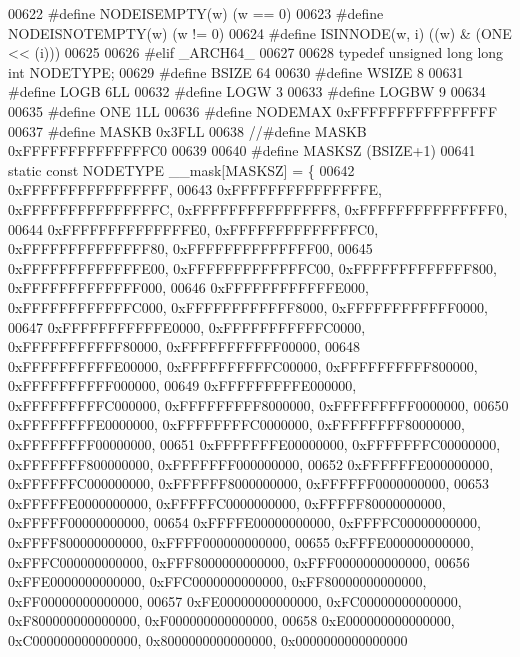 \begin{DoxyCode}
00622 \textcolor{preprocessor}{#define NODEISEMPTY(w) (w == 0)}
00623 \textcolor{preprocessor}{#define NODEISNOTEMPTY(w) (w != 0)}
00624 \textcolor{preprocessor}{#define ISINNODE(w, i) ((w) & (ONE << (i)))                                                     }
00625 \textcolor{preprocessor}{}
00626 \textcolor{preprocessor}{#elif \_ARCH64\_}
00627 
00628 \textcolor{keyword}{typedef} \textcolor{keywordtype}{unsigned} \textcolor{keywordtype}{long} \textcolor{keywordtype}{long} \textcolor{keywordtype}{int} NODETYPE; 
00629 \textcolor{preprocessor}{#define BSIZE 64}
00630 \textcolor{preprocessor}{#define WSIZE 8}
00631 \textcolor{preprocessor}{#define LOGB 6LL}
00632 \textcolor{preprocessor}{#define LOGW 3}
00633 \textcolor{preprocessor}{#define LOGBW 9}
00634 
00635 \textcolor{preprocessor}{#define ONE 1LL}
00636 \textcolor{preprocessor}{#define NODEMAX 0xFFFFFFFFFFFFFFFF}
00637 \textcolor{preprocessor}{#define MASKB 0x3FLL}
00638 \textcolor{comment}{//#define MASKB 0xFFFFFFFFFFFFFFC0}
00639 
00640 \textcolor{preprocessor}{#define MASKSZ (BSIZE+1)}
00641 \textcolor{keyword}{static} \textcolor{keyword}{const} NODETYPE \_\_mask[MASKSZ] = \{
00642         0xFFFFFFFFFFFFFFFF,
00643         0xFFFFFFFFFFFFFFFE, 0xFFFFFFFFFFFFFFFC, 0xFFFFFFFFFFFFFFF8, 0xFFFFFFFFFFFFFFF0,
00644         0xFFFFFFFFFFFFFFE0, 0xFFFFFFFFFFFFFFC0, 0xFFFFFFFFFFFFFF80, 0xFFFFFFFFFFFFFF00,
00645         0xFFFFFFFFFFFFFE00, 0xFFFFFFFFFFFFFC00, 0xFFFFFFFFFFFFF800, 0xFFFFFFFFFFFFF000,
00646         0xFFFFFFFFFFFFE000, 0xFFFFFFFFFFFFC000, 0xFFFFFFFFFFFF8000, 0xFFFFFFFFFFFF0000,
00647         0xFFFFFFFFFFFE0000, 0xFFFFFFFFFFFC0000, 0xFFFFFFFFFFF80000, 0xFFFFFFFFFFF00000,
00648         0xFFFFFFFFFFE00000, 0xFFFFFFFFFFC00000, 0xFFFFFFFFFF800000, 0xFFFFFFFFFF000000,
00649         0xFFFFFFFFFE000000, 0xFFFFFFFFFC000000, 0xFFFFFFFFF8000000, 0xFFFFFFFFF0000000,
00650         0xFFFFFFFFE0000000, 0xFFFFFFFFC0000000, 0xFFFFFFFF80000000, 0xFFFFFFFF00000000,
00651         0xFFFFFFFE00000000, 0xFFFFFFFC00000000, 0xFFFFFFF800000000, 0xFFFFFFF000000000,
00652         0xFFFFFFE000000000, 0xFFFFFFC000000000, 0xFFFFFF8000000000, 0xFFFFFF0000000000,
00653         0xFFFFFE0000000000, 0xFFFFFC0000000000, 0xFFFFF80000000000, 0xFFFFF00000000000,
00654         0xFFFFE00000000000, 0xFFFFC00000000000, 0xFFFF800000000000, 0xFFFF000000000000,
00655         0xFFFE000000000000, 0xFFFC000000000000, 0xFFF8000000000000, 0xFFF0000000000000,
00656         0xFFE0000000000000, 0xFFC0000000000000, 0xFF80000000000000, 0xFF00000000000000,
00657         0xFE00000000000000, 0xFC00000000000000, 0xF800000000000000, 0xF000000000000000,
00658         0xE000000000000000, 0xC000000000000000, 0x8000000000000000, 0x0000000000000000

\end{DoxyCode}

